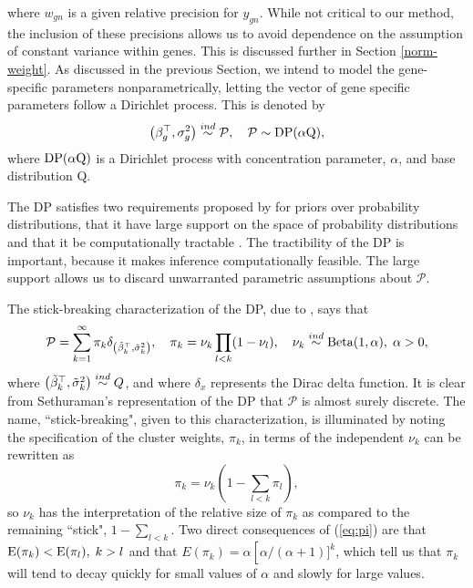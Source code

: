 where $w_{gn}$ is a given relative precision for $y_{gn}$. While not critical to our method, the inclusion of these precisions allows us to avoid dependence on the assumption of constant variance within genes. This is discussed further in Section \ref{norm-weight}. As discussed in the previous Section, we intend to model the gene-specific parameters nonparametrically, letting the vector of gene specific parameters follow a Dirichlet process. This is denoted by
\begin{equation}
\left(\beta_g^\top,\sigma^2_g\right) \stackrel{ind}{\sim} \mathcal{P},\quad \mathcal{P} \sim \operatorname{DP}(\alpha \mbox{Q}),
\end{equation}
where $\operatorname{DP}(\alpha \mbox{Q})$ is a Dirichlet process with concentration parameter, $\alpha$, and base distribution $\mbox{Q}$.

The DP satisfies two requirements proposed by \citet{ferguson} for priors over probability distributions, that it have large support on the space of probability distributions and that it be computationally tractable \citep{ferguson}. The tractibility of the DP is important, because it makes inference computationally feasible. The large support allows us to discard unwarranted parametric assumptions about $\mathcal{P}$.

The stick-breaking characterization of the DP, due to \citet{sethuraman}, says that 
\begin{equation}
\label{dp-def}
\mathcal{P} =\sum_{k=1}^\infty \pi_k \delta_{\left(\tilde{\beta}_k^\top ,\tilde{\sigma}^2_k\right)},\quad \pi_k = \nu_k \prod_{l<k}(1-\nu_l), \quad 
\nu_k \stackrel{ind}{\sim} \operatorname{Beta}(1, \alpha),\; \alpha>0,
\end{equation}
where $\left(\tilde{\beta}_k^\top ,\tilde{\sigma}^2_k\right) \stackrel{ind}{\sim} Q$, and where $\delta_{x}$ represents the Dirac delta function. It is clear from Sethuraman's representation of the DP that $\mathcal{P}$ is almost surely discrete. The name, ``stick-breaking", given to this characterization, is illuminated by noting the specification of the cluster weights, $\pi_k$, in terms of the independent $\nu_k$ can be rewritten as
\begin{equation}
\label{eq:pi}
\pi_k = \nu_k\left(1-\sum_{l<k}\pi_l\right),
\end{equation} so $\nu_k$ has the interpretation of the relative size of $\pi_k$ as compared to the remaining ``stick", $1-\sum_{l<k}$. Two direct consequences of (\ref{eq:pi}) are that $\operatorname{E}(\pi_k)<\operatorname{E}(\pi_l),\;k>l$ and that $E(\pi_k)=\alpha \left[\alpha/(\alpha+1)]^{k}$, which tell us that $\pi_k$ will tend to decay quickly for small values of  $\alpha$ and slowly for large values. 

